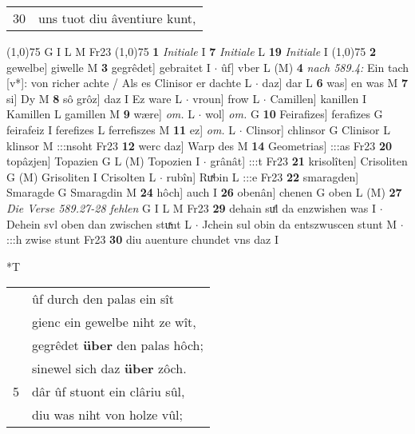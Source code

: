 \documentclass[8pt,a4paper,notitlepage]{article}
\begin{document}
\begin{table}[ht]
\begin{minipage}[t]{0.5\linewidth}
\begin{tabular}{rl}
30 & uns tuot diu âventiure kunt,\\ 
\end{tabular}
\scriptsize
\line(1,0){75} \newline
G I L M Fr23 \newline
\line(1,0){75} \newline
\textbf{1} \textit{Initiale} I  \textbf{7} \textit{Initiale} L  \textbf{19} \textit{Initiale} I  \newline
\line(1,0){75} \newline
\textbf{2} gewelbe] giwelle M \textbf{3} gegrêdet] gebraitet I  $\cdot$ ûf] vber L (M) \textbf{4} \textit{nach 589.4:} Ein tach [v*]: von richer achte / Als es Clinisor er dachte L   $\cdot$ daz] dar L \textbf{6} was] en was M \textbf{7} si] Dy M \textbf{8} sô grôz] daz I Ez ware L  $\cdot$ vroun] frow L  $\cdot$ Camillen] kanillen I Kamillen L gamillen M \textbf{9} wære] \textit{om.} L  $\cdot$ wol] \textit{om.} G \textbf{10} Feirafizes] ferafizes G feirafeiz I ferefizes L ferrefiszes M \textbf{11} ez] \textit{om.} L  $\cdot$ Clinsor] chlinsor G Clinisor L klinsor M :::nsoht Fr23 \textbf{12} werc daz] Warp des M \textbf{14} Geometrias] :::as Fr23 \textbf{20} topâzjen] Topazien G L (M) Topozien I  $\cdot$ grânât] :::t Fr23 \textbf{21} krisolîten] Crisoliten G (M) Grisoliten I Crisolten L  $\cdot$ rubîn] Ruͯbin L :::e Fr23 \textbf{22} smaragden] Smaragde G Smaragdin M \textbf{24} hôch] auch I \textbf{26} obenân] chenen G oben L (M) \textbf{27} \textit{Die Verse 589.27-28 fehlen} G I L M Fr23  \textbf{29} dehain suͤl da enzwishen was I  $\cdot$ Dehein svl oben dan zwischen stuͯnt L  $\cdot$ Jchein sul obin da entszwuscen stunt M  $\cdot$ :::h zwise stunt Fr23 \textbf{30} diu auenture chundet vns daz I \newline
\end{minipage}
\hspace{0.5cm}
\begin{minipage}[t]{0.5\linewidth}
\small
\begin{center}*T
\end{center}
\begin{tabular}{rl}
 & ûf durch den palas ein sît\\ 
 & gienc ein gewelbe niht ze wît,\\ 
 & gegrêdet \textbf{über} den palas hôch;\\ 
 & sinewel sich daz \textbf{über} zôch.\\ 
5 & dâr ûf stuont ein clâriu sûl,\\ 
 & diu was niht von holze vûl;\\ 

\end{tabular}
\end{minipage}
\end{table}
\end{document}
